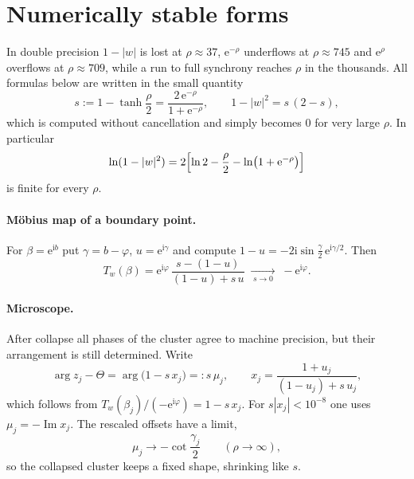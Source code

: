 \documentclass[a4paper,11pt]{article}
\newcommand{\T}{T}                       %
\newcommand{\im}{\operatorname{Im}}
\newcommand{\e}{\mathrm{e}}
\newcommand{\ii}{\mathrm{i}}
\theoremstyle{remark}
\begin{document}
\section{Numerically stable forms}\label{sec:stable}

In double precision $1-|w|$ is lost at $\rho\approx37$, $\e^{-\rho}$ underflows
at $\rho\approx745$ and $\e^{\rho}$ overflows at $\rho\approx709$, while a run
to full synchrony reaches $\rho$ in the thousands. All formulas below are
written in the small quantity
\begin{equation}\label{eq:s-def}
s:=1-\tanh\frac\rho2=\frac{2\,\e^{-\rho}}{1+\e^{-\rho}},\qquad
1-|w|^2=s\,(2-s),
\end{equation}
which is computed without cancellation and simply becomes $0$ for very large
$\rho$. In particular
\begin{equation}\label{eq:log-one-minus}
\ln(1-|w|^2)=2\Bigl[\ln2-\frac\rho2-\ln\bigl(1+\e^{-\rho}\bigr)\Bigr]
\end{equation}
is finite for every $\rho$.

\paragraph{M\"obius map of a boundary point.} For $\beta=\e^{\ii b}$ put
$\gamma=b-\varphi$, $u=\e^{\ii\gamma}$ and compute
$1-u=-2\ii\sin\frac\gamma2\,\e^{\ii\gamma/2}$. Then
\begin{equation}\label{eq:stable-mobius}
\T_w(\beta)=\e^{\ii\varphi}\,\frac{s-(1-u)}{(1-u)+s\,u}\;\xrightarrow[\;s\to0\;]{}\;-\e^{\ii\varphi}.
\end{equation}

\paragraph{Microscope.} After collapse all phases of the cluster agree to
machine precision, but their arrangement is still determined. Write
\begin{equation}\label{eq:microscope}
\arg z_j-\Theta=\arg\bigl(1-s\,x_j\bigr)=:s\,\mu_j,\qquad
x_j=\frac{1+u_j}{(1-u_j)+s\,u_j},
\end{equation}
which follows from $\T_w(\beta_j)/(-\e^{\ii\varphi})=1-s\,x_j$. For
$s|x_j|<10^{-8}$ one uses $\mu_j=-\im x_j$. The rescaled offsets have a limit,
\begin{equation}\label{eq:microscope-limit}
\mu_j\to-\cot\frac{\gamma_j}{2}\qquad(\rho\to\infty),
\end{equation}
so the collapsed cluster keeps a fixed shape, shrinking like $s$.
\end{document}
